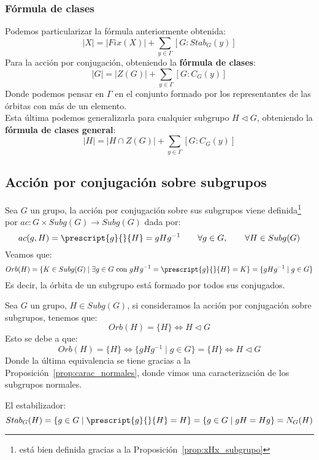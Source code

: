\subsubsection{Fórmula de clases}
\noindent
Podemos particularizar la fórmula anteriormente obtenida:
\begin{equation*}
    |X| = |Fix(X)| + \sum_{y\in \Gamma} [G:Stab_G(y)]
\end{equation*}
Para la acción por conjugación, obteniendo la \textbf{fórmula de clases}:
\begin{equation*}
    |G| = |Z(G)| + \sum_{y\in \Gamma} [G:C_G(y)]
\end{equation*}
Donde podemos pensar en $\Gamma$ en el conjunto formado por los representantes de las órbitas con más de un elemento.\\

\noindent
Esta última podemos generalizarla para cualquier subgrupo $H\lhd G$, obteniendo la \textbf{fórmula de clases general}:
\begin{equation*}
    |H| = |H\cap Z(G)| + \sum_{y\in \Gamma} [G:C_G(y)]
\end{equation*}

\subsection{Acción por conjugación sobre subgrupos}
\noindent
Sea $G$ un grupo, la acción por conjugación sobre sus subgrupos viene definida\footnote{está bien definida gracias a la Proposición~\ref{prop:xHx_subgrupo}} por $ac:G\times Subg(G)\to Subg(G)$ dada por:
\begin{equation*}
    ac(g,H) = \prescript{g}{}{H} = gHg^{-1} \qquad \forall g\in G, \qquad \forall H\in Subg(G)
\end{equation*}
Veamos que:
\begin{equation*}
    Orb(H) = \{K\in Subg(G) \mid \exists g\in G \text{\ con\ } gHg^{-1} = \prescript{g}{}{H} = K \} = \{gHg^{-1} \mid g\in G\}
\end{equation*}
Es decir, la órbita de un subgrupo está formado por todos sus conjugados.

\begin{observacion}
    Sea $G$ un grupo, $H\in Subg(G)$, si consideramos la acción por conjugación sobre subgrupos, tenemos que:
    \begin{equation*}
        Orb(H) = \{H\} \Longleftrightarrow H\lhd G
    \end{equation*}
    Esto se debe a que:
    \begin{equation*}
        Orb(H) = \{H\} \Longleftrightarrow \{gHg^{-1}\mid g\in G\} = \{H\} \Longleftrightarrow H \lhd G
    \end{equation*}
    Donde la última equivalencia se tiene gracias a la Proposición~\ref{prop:carac_normales}, donde vimos una caracterización de los subgrupos normales.
\end{observacion}
El estabilizador:
\begin{equation*}
    Stab_G(H) = \{g\in G \mid \prescript{g}{}{H} = H\} = \{g\in G \mid gH = Hg\} = N_G(H)
\end{equation*}

